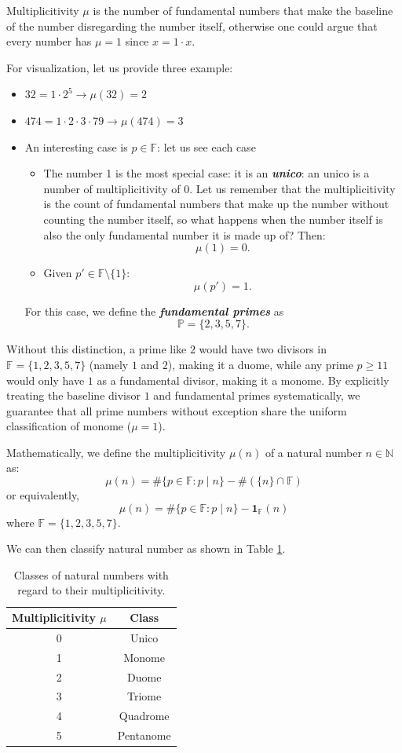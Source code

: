 \documentclass{article}
\begin{document}
Multiplicitivity $\mu$ is the number of fundamental numbers that make the baseline of the number disregarding the number itself, otherwise one could argue that every number has $\mu = 1$ since $x = 1\cdot x$.

For visualization, let us provide three example:
\begin{itemize}
    \item $32 = 1\cdot 2^5 \rightarrow \mu(32)=2$
    \item $474 = 1\cdot 2\cdot3\cdot 79 \rightarrow\mu(474)=3$
    \item An interesting case is $p\in\mathbb{F}$: let us see each case
    \begin{itemize}
        \item The number 1 is the most special case: it is an \textit{\textbf{unico}}: an unico is a number of multiplicitivity of 0. Let us remember that the multiplicitivity is the count of fundamental numbers that make up the number without counting the number itself, so what happens when the number itself is also the only fundamental number it is made up of? Then: $$\mu(1)=0.$$
        \item Given $p'\in\mathbb{F}\setminus\{1\}$:
        $$    \mu(p')=1.
        $$
    \end{itemize}
    For this case, we define the \textit{\textbf{fundamental primes}} as $$\mathbb{P}=\{2,3,5,7\}.$$
\end{itemize}
Without this distinction, a prime like $2$ would have two divisors in $\mathbb{F} = \{1, 2, 3, 5, 7\}$ (namely $1$ and $2$), making it a duome, while any prime $p \ge 11$ would only have $1$ as a fundamental divisor, making it a monome. By explicitly treating the baseline divisor $1$ and fundamental primes systematically, we guarantee that all prime numbers without exception share the uniform classification of monome ($\mu = 1$).


Mathematically, we define the multiplicitivity $\mu(n)$ of a natural number $n \in \mathbb{N}$ as:
\[
\mu(n) = \#\{p \in \mathbb{F} : p \mid n\} - \#(\{n\} \cap \mathbb{F})
\]
or equivalently,
\[
\mu(n) = \#\{p \in \mathbb{F} : p \mid n\} - \mathbf{1}_{\mathbb{F}}(n)
\]
where $\mathbb{F} = \{1, 2, 3, 5, 7\}$.

We can then classify natural number as shown in Table \ref{tab:classes}.

\begin{table}[h!]
    \centering
    \begin{tabular}{c|c}
        Multiplicitivity $\mu$ & Class  \\
        \hline
        0 & Unico \\
        1 & Monome \\
        2 & Duome \\
        3 & Triome \\
        4 & Quadrome \\
        5 & Pentanome
    \end{tabular}
    \caption{Classes of natural numbers with regard to their multiplicitivity.}
    \label{tab:classes}
\end{table}
\end{document}

